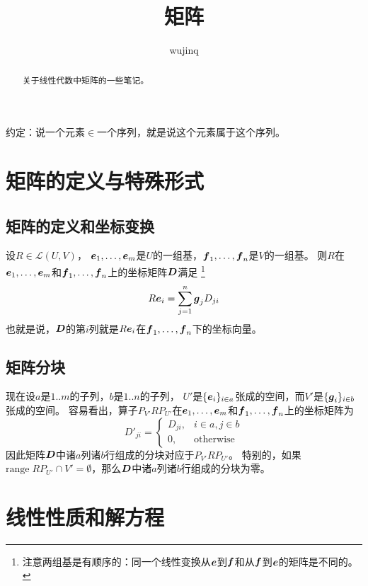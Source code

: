 \documentclass[UTF8]{ctexart}
\title{矩阵}
\author{wujinq}
\newcommand*{\otherwise}{\text{otherwise}}
\newcommand*{\range}{\mathrm{range}\;}
\theoremstyle{definition}
\begin{document}
\maketitle

\begin{abstract}
    关于线性代数中矩阵的一些笔记。
\end{abstract}

约定：说一个元素$\in$一个序列，就是说这个元素属于这个序列。

\section{矩阵的定义与特殊形式}

\subsection{矩阵的定义和坐标变换}

设$R \in \mathcal{L}(U, V)$，
$\vb*{e}_1, \ldots, \vb*{e}_m$是$U$的一组基，$\vb*{f}_1, \ldots, \vb*{f}_n$是$V$的一组基。
则$R$在$\vb*{e}_1, \ldots, \vb*{e}_m$和$\vb*{f}_1, \ldots, \vb*{f}_n$上的坐标矩阵$\vb*{D}$满足%
\footnote{注意两组基是有顺序的：同一个线性变换从$\vb*{e}$到$\vb*{f}$和从$\vb*{f}$到$\vb*{e}$的矩阵是不同的。}
\[
    R \vb*{e}_i = \sum_{j=1}^n \vb*{g}_j D_{ji}
\]
也就是说，$\vb*{D}$的第$i$列就是$R \vb*{e}_i$在$\vb*{f}_1, \ldots, \vb*{f}_n$下的坐标向量。

\subsection{矩阵分块}

现在设$a$是$1..m$的子列，$b$是$1..n$的子列，
$U'$是$\{\vb*{e}_i\}_{i \in a}$张成的空间，而$V'$是$\{\vb*{g}_i\}_{i \in b}$张成的空间。
容易看出，算子$P_{V'} R P_{U'}$在$\vb*{e}_1, \ldots, \vb*{e}_m$和$\vb*{f}_1, \ldots, \vb*{f}_n$上的坐标矩阵为
\[
    D'_{ji} = 
    \begin{cases}
        D_{ji}, & i \in a, j \in b \\
        0, & \otherwise
    \end{cases}
\]
因此矩阵$\vb*{D}$中诸$a$列诸$b$行组成的分块对应于$P_{V'} R P_{U'}$。
特别的，如果$\range R P_{U'} \cap V' = \emptyset$，那么$\vb*{D}$中诸$a$列诸$b$行组成的分块为零。

\section{线性性质和解方程}
\end{document}
